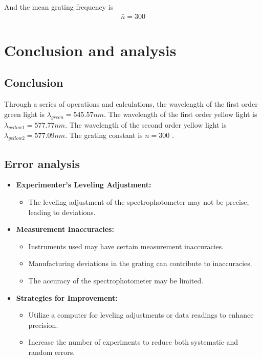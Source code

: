 \documentclass[UTF8]{article}
\begin{document}
  	   	 And the mean grating frequency is 
  	   	 \begin{eqnarray}
  	   	 \bar{n} = 300
  	   	 \end{eqnarray}
  

\section{Conclusion and analysis}
\subsection{Conclusion}
Through a series of operations and calculations, the wavelength of the first order green light is  $\lambda_{green} = 545.57 nm$.
The wavelength of the first order yellow light is  $\lambda_{yellow1} = 577.77 nm$. 
The wavelength of the second order yellow light is $\lambda_{yellow2} = 577.09 nm$.
The grating constant is $n = 300$ .


\subsection{Error analysis}
\begin{itemize}
  \item \textbf{Experimenter's Leveling Adjustment:}
    \begin{itemize}
      \item The leveling adjustment of the spectrophotometer may not be precise, leading to deviations.
    \end{itemize}

  \item \textbf{Measurement Inaccuracies:}
    \begin{itemize}
      \item Instruments used may have certain measurement inaccuracies.
      \item Manufacturing deviations in the grating can contribute to inaccuracies.
      \item The accuracy of the spectrophotometer may be limited.
    \end{itemize}

  \item \textbf{Strategies for Improvement:}
    \begin{itemize}
      \item Utilize a computer for leveling adjustments or data readings to enhance precision.
      \item Increase the number of experiments to reduce both systematic and random errors.
    \end{itemize}
\end{itemize}
\end{document}
